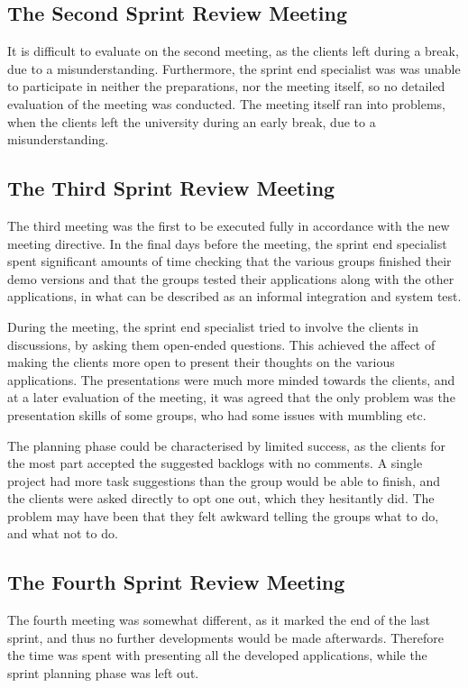 \subsection{The Second Sprint Review Meeting}
\label{collab:sprintend:two}
It is difficult to evaluate on the second meeting, as the clients left during a break, due to a misunderstanding. Furthermore, the sprint end specialist was was unable to participate in neither the preparations, nor the meeting itself, so no detailed evaluation of the meeting was conducted. The meeting itself ran into problems, when the clients left the university during an early break, due to a misunderstanding. 

\subsection{The Third Sprint Review Meeting}
\label{collab:sprintend:three}
The third meeting was the first to be executed fully in accordance with the new meeting directive. In the final days before the meeting, the sprint end specialist spent significant amounts of time checking that the various groups finished their demo versions and that the groups tested their applications along with the other applications, in what can be described as an informal integration and system test. 

During the meeting, the sprint end specialist tried to involve the clients in discussions, by asking them open-ended questions. This achieved the affect of making the clients more open to present their thoughts on the various applications. The presentations were much more minded towards the clients, and at a later evaluation of the meeting, it was agreed that the only problem was the presentation skills of some groups, who had some issues with mumbling etc.

The planning phase could be characterised by limited success, as the clients for the most part accepted the suggested backlogs with no comments. A single project had more task suggestions than the group would be able to finish, and the clients were asked directly to opt one out, which they hesitantly did. The problem may have been that they felt awkward telling the groups what to do, and what not to do.

\subsection{The Fourth Sprint Review Meeting}
\label{collab:sprintend:four}
The fourth meeting was somewhat different, as it marked the end of the last sprint, and thus no further developments would be made afterwards. Therefore the time was spent with presenting all the developed applications, while the sprint planning phase was left out. 

